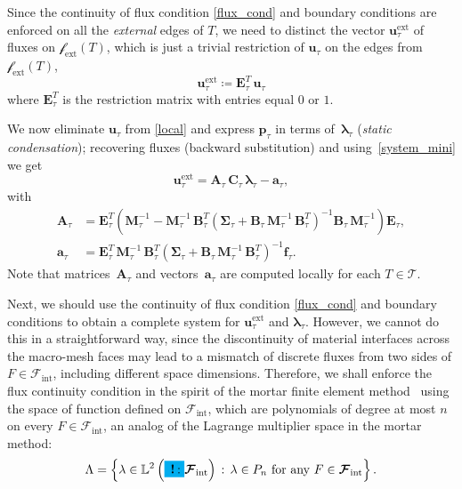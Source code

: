 \documentclass[12pt]{article}
\newcommand{\vect}[1]{\boldsymbol{\mathbf{#1}}}
\newcommand{\bmesh}{{\vect{\mathcal T}}}
\newcommand{\mmesh}{{\vect{\mathcal \tau}}}
\newcommand{\bfaces}[1][]{{\vect{\mathcal F}_{\text{#1}}}}
\newcommand{\mfaces}[1][]{{\vect{\mathcal f}_{\text{#1}}}}
\newcommand{\LTwoSpace}[1][\Omega]{{\mathbb L^2\left({#1}\right)}}
\newcommand{\toDiscuss}[1]{\colorbox{Cyan}{\textbf{\,!\,}:} #1}
\begin{document}
Since the continuity of flux condition \eqref{flux_cond} and boundary conditions are enforced on all the \emph{external} edges of $T$, we need to distinct the vector ${\vect u}^\text{ext}_\mmesh$ of fluxes on $\mfaces[ext](T)$, which is just a trivial restriction of ${\vect u}_\mmesh$ on the edges  from $\mfaces[ext](T)$,
\begin{equation}\label{system_mini}
	{\vect u}^\text{ext}_\mmesh \coloneqq \vect E_\mmesh^T\,{\vect u}_\mmesh
\end{equation}
where $\vect E_\mmesh^T$ is the restriction matrix with entries equal $0$ or $1$.

We now eliminate ${\vect u}_\mmesh$ from \eqref{local} and express ${\vect p}_\mmesh$ in terms of~${\vect \lambda}_\mmesh$ (\textit{static condensation}); recovering fluxes (backward substitution) and using~\eqref{system_mini} we get
\begin{equation}\label{mini_flux_dofs}
	{\vect u}^\text{ext}_\mmesh = \vect A_\mmesh\,\vect C_\mmesh\,{\vect \lambda}_\mmesh - {\vect a}_\mmesh,
\end{equation}
with
\begin{align} \label{defA}
	\vect A_\mmesh &= \vect E^T_\mmesh \left( \vect M^{-1}_\mmesh - \vect M^{-1}_\mmesh\,\vect B^T_\mmesh \left( \vect \Sigma_\mmesh + \vect B_\mmesh\,\vect M^{-1}_\mmesh\,\vect B^{T}_\mmesh\right)^{-1} \vect B_\mmesh\,\vect M^{-1}_\mmesh \right) \vect E_\mmesh, \\
	{\vect a}_\mmesh &= \vect E^{T}_\mmesh\,\vect M^{-1}_\mmesh\,\vect B^T_\mmesh \left( \vect \Sigma_\mmesh + \vect B_\mmesh\,\vect M^{-1}_\mmesh\,\vect B^{T}_\mmesh\right)^{-1} {\vect f}_\mmesh.
\end{align}
Note that matrices~$\vect A_\mmesh$ and vectors~${\vect a}_\mmesh$ are computed locally for each $T\in\bmesh$.
\smallskip
		
Next, we should use the continuity of flux condition \eqref{flux_cond} and boundary conditions to obtain a complete system for ${\vect u}^\text{ext}_\mmesh$ and ${\vect \lambda}_\mmesh$. However, we cannot do this in a straightforward way, since the discontinuity of material interfaces across the macro-mesh faces may lead to a mismatch of discrete fluxes from two sides of $F\in\bfaces[int]$, including different space dimensions.
Therefore, we shall enforce the flux continuity condition in the spirit of the mortar finite element method~\cite{mortar} using the space of function defined on $\bfaces[int]$, which are polynomials of degree at most $n$ on every $F\in\bfaces[int]$, an analog of the Lagrange multiplier space in the mortar method:
\[
\Lambda=\left\{\lambda\in \LTwoSpace[\toDiscuss{\bfaces[int]}]\,:\, \lambda\in P_n~\text{for any}~F\in\bfaces[int]\right\}.
\]
\end{document}
